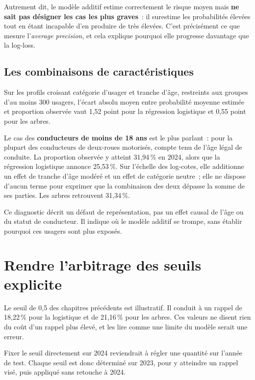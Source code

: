 Autrement dit, le modèle additif estime correctement le risque moyen mais \textbf{ne sait
pas désigner les cas les plus graves}~: il surestime les probabilités élevées tout en
étant incapable d'en produire de très élevées. C'est précisément ce que mesure
l'\textit{average precision}, et cela explique pourquoi elle progresse davantage que
la log-loss.

\subsection{Les combinaisons de caractéristiques}


Sur les profils croisant catégorie d'usager et tranche d'âge, restreints aux groupes
d'au moins 300 usagers, l'écart absolu moyen entre probabilité moyenne estimée et
proportion observée vaut 1,52 point pour la régression logistique et 0,55 point pour
les arbres.

Le cas des \textbf{conducteurs de moins de 18 ans} est le plus parlant~: pour la plupart
des conducteurs de deux-roues motorisés, compte tenu de l'âge légal de conduite. La
proportion observée y atteint 31,94\,\% en 2024, alors que la régression logistique
annonce 25,53\,\%. Sur l'échelle des log-cotes, elle additionne un effet de tranche
d'âge modéré et un effet de catégorie neutre~; elle ne dispose d'aucun terme pour
exprimer que la combinaison des deux dépasse la somme de ses parties. Les arbres
retrouvent 31,34\,\%.

Ce diagnostic décrit un défaut de représentation, pas un effet causal de l'âge ou du
statut de conducteur. Il indique où le modèle additif se trompe, sans établir pourquoi
ces usagers sont plus exposés.

\section{Rendre l'arbitrage des seuils explicite}
Le seuil de 0,5 des chapitres précédents est illustratif. Il conduit à un rappel de
18,22\,\% pour la logistique et de 21,16\,\% pour les arbres. Ces valeurs ne disent rien
du coût d'un rappel plus élevé, et les lire comme une limite du modèle serait une erreur.

Fixer le seuil directement sur 2024 reviendrait à régler une quantité sur l'année de
test. Chaque seuil est donc déterminé sur 2023, pour y atteindre un rappel visé, puis
appliqué sans retouche à 2024.


